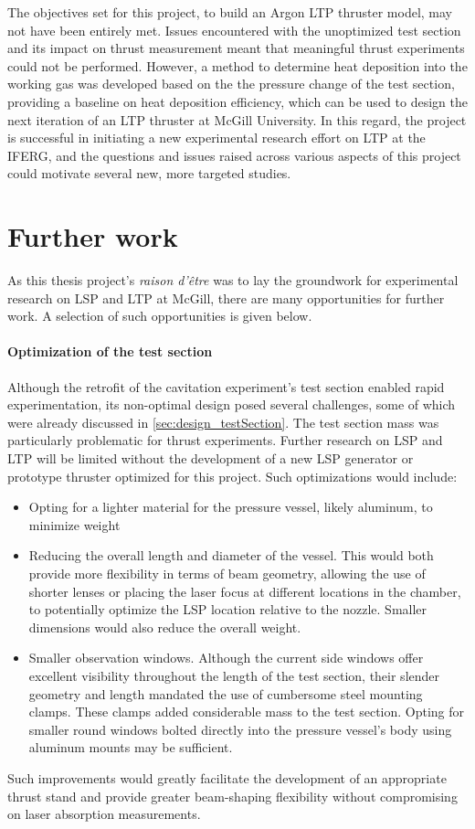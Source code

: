     The objectives set for this project, to build an Argon LTP thruster model, may not have been entirely met. Issues encountered with the unoptimized test section and its impact on thrust measurement meant that meaningful thrust experiments could not be performed. However, a method to determine heat deposition into the working gas was developed based on the the pressure change of the test section, providing a baseline on heat deposition efficiency, which can be used to design the next iteration of an LTP thruster at McGill University. In this regard, the project is successful in initiating a new experimental research effort on LTP at the IFERG, and the questions and issues raised across various aspects of this project could motivate several new, more targeted studies.

    \section{Further work}
        As this thesis project's \emph{raison d'être} was to lay the groundwork for experimental research on LSP and LTP at McGill, there are many opportunities for further work. A selection of such opportunities is given below.

        \paragraph{Optimization of the test section} Although the retrofit of the cavitation experiment's test section enabled rapid experimentation, its non-optimal design posed several challenges, some of which were already discussed in \autoref{sec:design_testSection}. The test section mass was particularly problematic for thrust experiments. Further research on LSP and LTP will be limited without the development of a new LSP generator or prototype thruster optimized for this project. Such optimizations would include:
        \begin{itemize}
            \item Opting for a lighter material for the pressure vessel, likely aluminum, to minimize weight
            \item Reducing the overall length and diameter of the vessel. This would both provide more flexibility in terms of beam geometry, allowing the use of shorter lenses or placing the laser focus at different locations in the chamber, to potentially optimize the LSP location relative to the nozzle. Smaller dimensions would also reduce the overall weight.
            \item Smaller observation windows. Although the current side windows offer excellent visibility throughout the length of the test section, their slender geometry and length mandated the use of cumbersome steel mounting clamps. These clamps added considerable mass to the test section. Opting for smaller round windows bolted directly into the pressure vessel's body using aluminum mounts may be sufficient.
        \end{itemize}
        Such improvements would greatly facilitate the development of an appropriate thrust stand and provide greater beam-shaping flexibility without compromising on laser absorption measurements.

